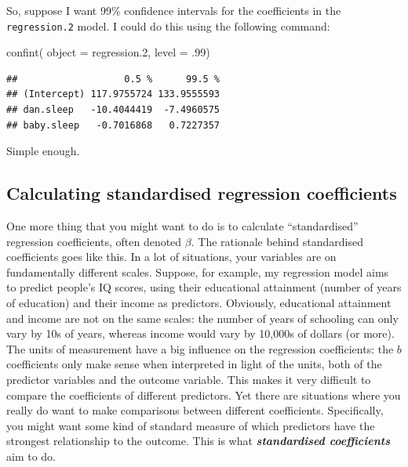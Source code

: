 \documentclass[
]{book}
\newenvironment{Shaded}{\begin{snugshade}}{\end{snugshade}}
\newcommand{\AttributeTok}[1]{\textcolor[rgb]{0.77,0.63,0.00}{#1}}
\newcommand{\DecValTok}[1]{\textcolor[rgb]{0.00,0.00,0.81}{#1}}
\newcommand{\FloatTok}[1]{\textcolor[rgb]{0.00,0.00,0.81}{#1}}
\newcommand{\FunctionTok}[1]{\textcolor[rgb]{0.00,0.00,0.00}{#1}}
\newcommand{\NormalTok}[1]{#1}
\begin{document}
So, suppose I want 99\% confidence intervals for the coefficients in the \texttt{regression.2} model. I could do this using the following command:

\begin{Shaded}
\begin{Highlighting}[]
\FunctionTok{confint}\NormalTok{( }\AttributeTok{object =}\NormalTok{ regression}\FloatTok{.2}\NormalTok{,}
        \AttributeTok{level =}\NormalTok{ .}\DecValTok{99}\NormalTok{)}
\end{Highlighting}
\end{Shaded}

\begin{verbatim}
##                   0.5 %      99.5 %
## (Intercept) 117.9755724 133.9555593
## dan.sleep   -10.4044419  -7.4960575
## baby.sleep   -0.7016868   0.7227357
\end{verbatim}

Simple enough.

\hypertarget{calculating-standardised-regression-coefficients}{%
\subsection{Calculating standardised regression coefficients}\label{calculating-standardised-regression-coefficients}}

One more thing that you might want to do is to calculate ``standardised'' regression coefficients, often denoted \(\beta\). The rationale behind standardised coefficients goes like this. In a lot of situations, your variables are on fundamentally different scales. Suppose, for example, my regression model aims to predict people's IQ scores, using their educational attainment (number of years of education) and their income as predictors. Obviously, educational attainment and income are not on the same scales: the number of years of schooling can only vary by 10s of years, whereas income would vary by 10,000s of dollars (or more). The units of measurement have a big influence on the regression coefficients: the \(b\) coefficients only make sense when interpreted in light of the units, both of the predictor variables and the outcome variable. This makes it very difficult to compare the coefficients of different predictors. Yet there are situations where you really do want to make comparisons between different coefficients. Specifically, you might want some kind of standard measure of which predictors have the strongest relationship to the outcome. This is what \textbf{\emph{standardised coefficients}} aim to do.
\end{document}
